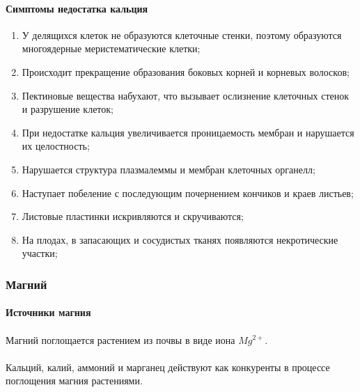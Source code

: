\paragraph*{Симптомы недостатка кальция}

\begin{enumerate}
	\item У делящихся клеток не образуются клеточные стенки, поэтому образуются многоядерные меристематические клетки; 
	\item Происходит прекращение образования боковых корней и корневых волосков;
	\item Пектиновые вещества набухают, что вызывает ослизнение клеточных стенок и разрушение клеток;
	\item При недостатке кальция увеличивается проницаемость мембран и нарушается их целостность;
	\item Нарушается структура плазмалеммы и мембран клеточных органелл;
	\item Наступает побеление с последующим почернением кончиков и краев листьев;
	\item Листовые пластинки искривляются и скручиваются;
	\item На плодах, в запасающих и сосудистых тканях появляются некротические участки;
\end{enumerate} 

\subsubsection*{Магний}

\paragraph*{Источники магния}

\paragraph*{}Магний поглощается растением из почвы в виде иона $Mg^{2+}$. 


\paragraph*{}Кальций, калий, аммоний и марганец действуют как конкуренты в процессе поглощения магния растениями.

